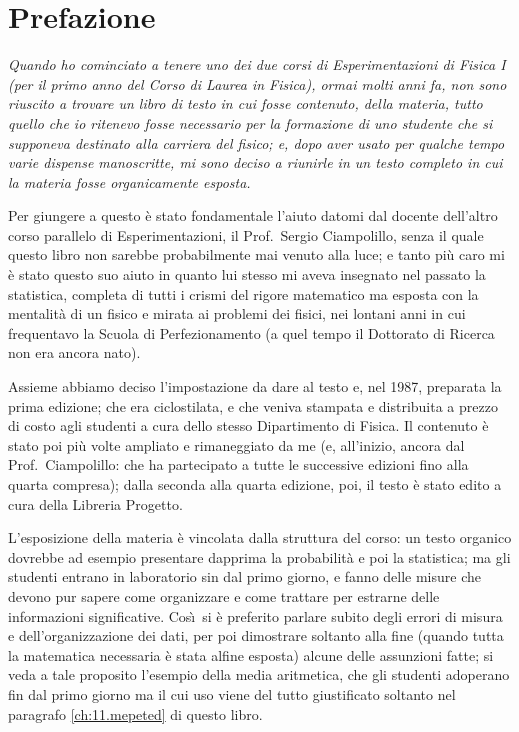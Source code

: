 
\chapter*{Prefazione}

{\itshape Quando ho cominciato a tenere uno dei due corsi di
  Esperimentazioni di Fisica I (per il primo anno del Corso
  di Laurea in Fisica), ormai molti anni fa, non sono
  riuscito a trovare un libro di testo in cui fosse
  contenuto, della materia, tutto quello che io ritenevo
  fosse necessario per la formazione di uno studente che si
  supponeva destinato alla carriera del fisico; e, dopo aver
  usato per qualche tempo varie dispense manoscritte, mi
  sono deciso a riunirle in un testo completo in cui la
  materia fosse organicamente esposta.

  Per giungere a questo \`e stato fondamentale l'aiuto
  datomi dal docente dell'altro corso parallelo di
  Esperimentazioni, il Prof.\ Sergio Ciampolillo, senza il
  quale questo libro non sarebbe probabilmente mai venuto
  alla luce; e tanto pi\`u caro mi \`e stato questo suo
  aiuto in quanto lui stesso mi aveva insegnato nel passato
  la statistica, completa di tutti i crismi del rigore
  matematico ma esposta con la mentalit\`a di un fisico e
  mirata ai problemi dei fisici, nei lontani anni in cui
  frequentavo la Scuola di Perfezionamento (a quel tempo il
  Dottorato di Ricerca non era ancora nato).

  Assieme abbiamo deciso l'impostazione da dare al testo e,
  nel 1987, preparata la prima edizione; che era
  ciclostilata, e che veniva stampata e distribuita a prezzo
  di costo agli studenti a cura dello stesso Dipartimento di
  Fisica.  Il contenuto \`e stato poi pi\`u volte ampliato e
  rimaneggiato da me (e, all'inizio, ancora dal Prof.\
  Ciampolillo: che ha partecipato a tutte le successive
  edizioni fino alla quarta compresa); dalla seconda alla
  quarta edizione, poi, il testo \`e stato edito a cura
  della Libreria Progetto.

  L'esposizione della materia \`e vincolata dalla struttura
  del corso: un testo organico dovrebbe ad esempio
  presentare dapprima la probabilit\`a e poi la statistica;
  ma gli studenti entrano in laboratorio sin dal primo
  giorno, e fanno delle misure che devono pur sapere come
  organizzare e come trattare per estrarne delle
  informazioni significative.  Cos\`\i\ si \`e preferito
  parlare subito degli errori di misura e
  dell'organizzazione dei dati, per poi dimostrare soltanto
  alla fine (quando tutta la matematica necessaria \`e stata
  alfine esposta) alcune delle assunzioni fatte; si veda a
  tale proposito l'esempio della media aritmetica, che gli
  studenti adoperano fin dal primo giorno ma il cui uso
  viene del tutto giustificato soltanto nel paragrafo
  \ref{ch:11.mepeted} di questo libro.

}

